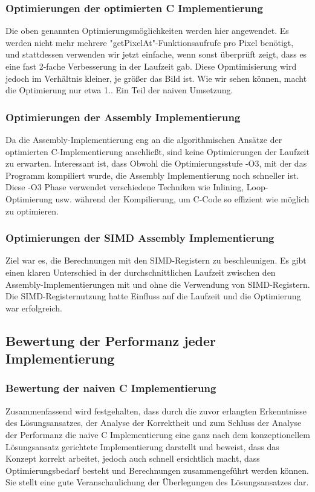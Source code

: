 \documentclass[course=asp]{aspdoc}
\begin{document}
\subsubsection{Optimierungen der optimierten C Implementierung}
Die oben genannten Optimierungsmöglichkeiten werden hier angewendet. Es werden nicht mehr mehrere "getPixelAt"-Funktionsaufrufe pro Pixel benötigt, und stattdessen verwenden wir jetzt einfache, wenn sonst überprüft  zeigt, dass es eine fast 2-fache Verbesserung in der Laufzeit gab. Diese Opmtimisierung wird jedoch im Verhältnis kleiner, je größer das Bild ist. Wie wir sehen können, macht die Optimierung nur etwa 1.. Ein Teil der naiven Umsetzung.

\subsubsection{Optimierungen der Assembly Implementierung}
Da die Assembly-Implementierung eng an die algorithmischen Ansätze der optimierten C-Implementierung anschließt, sind keine Optimierungen der Laufzeit zu erwarten. Interessant ist, dass Obwohl die Optimierungsstufe -O3, mit der das Programm kompiliert wurde, die Assembly Implementierung noch schneller ist. Diese -O3 Phase verwendet verschiedene Techniken wie Inlining, Loop-Optimierung usw. während der Kompilierung, um C-Code so effizient wie möglich zu optimieren.

\subsubsection{Optimierungen der SIMD Assembly Implementierung}
Ziel war es, die Berechnungen mit den SIMD-Registern zu beschleunigen. Es gibt einen klaren Unterschied in der durchschnittlichen Laufzeit zwischen den Assembly-Implementierungen mit und ohne die Verwendung von SIMD-Registern. Die SIMD-Registernutzung hatte Einfluss auf die Laufzeit und die Optimierung war erfolgreich.

\subsection{Bewertung der Performanz jeder Implementierung}

\subsubsection{Bewertung der naiven C Implementierung}
Zusammenfassend wird festgehalten, dass durch die zuvor erlangten Erkenntnisse des Lösungsansatzes, der Analyse der Korrektheit und zum Schluss der Analyse der Performanz die naive C Implementierung eine ganz nach dem konzeptionellem Lösungsansatz gerichtete Implementierung darstellt und beweist, dass das Konzept korrekt arbeitet, jedoch auch schnell ersichtlich macht, dass Optimierungsbedarf besteht und Berechnungen zusammengeführt werden können. Sie stellt eine gute Veranschaulichung der Überlegungen des Lösungsansatzes dar.
\end{document}
